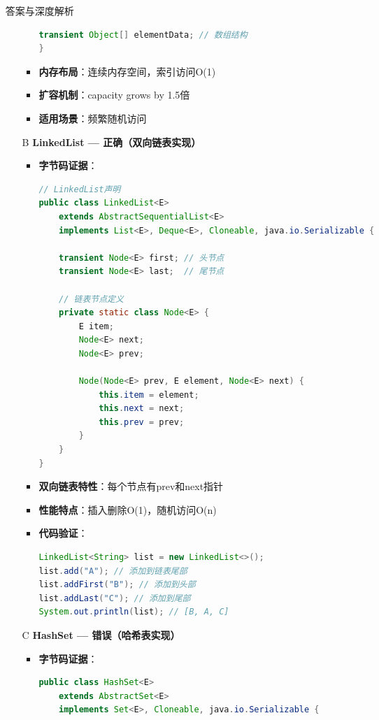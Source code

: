 \documentclass[12pt, a4paper]{ctexart}
\begin{document}
\begin{enumerate}[label=\textbf{\arabic*.}]
\begin{bluebox}{答案与深度解析}
\begin{itemize}[leftmargin=*, nosep, label={}]
\begin{itemize}[label={}, leftmargin=*, nosep]
\begin{lstlisting}[language=Java]
    transient Object[] elementData; // 数组结构
}
				      \end{lstlisting}
				            \item \textbf{内存布局}：连续内存空间，索引访问O(1)
				            \item \textbf{扩容机制}：capacity grows by 1.5倍
				            \item \textbf{适用场景}：频繁随机访问
			            \end{itemize}

			      \item[B] \textbf{LinkedList — 正确（双向链表实现）}
			            \begin{itemize}[label={}, leftmargin=*, nosep]
				            \item \textbf{字节码证据}：
				                  \begin{lstlisting}[language=Java]
// LinkedList声明
public class LinkedList<E>
    extends AbstractSequentialList<E>
    implements List<E>, Deque<E>, Cloneable, java.io.Serializable {

    transient Node<E> first; // 头节点
    transient Node<E> last;  // 尾节点

    // 链表节点定义
    private static class Node<E> {
        E item;
        Node<E> next;
        Node<E> prev;

        Node(Node<E> prev, E element, Node<E> next) {
            this.item = element;
            this.next = next;
            this.prev = prev;
        }
    }
}
				      \end{lstlisting}
				            \item \textbf{双向链表特性}：每个节点有prev和next指针
				            \item \textbf{性能特点}：插入删除O(1)，随机访问O(n)
				            \item \textbf{代码验证}：
				                  \begin{lstlisting}[language=Java]
LinkedList<String> list = new LinkedList<>();
list.add("A"); // 添加到链表尾部
list.addFirst("B"); // 添加到头部
list.addLast("C"); // 添加到尾部
System.out.println(list); // [B, A, C]
				      \end{lstlisting}
			            \end{itemize}

			      \item[C] \textbf{HashSet — 错误（哈希表实现）}
			            \begin{itemize}[label={}, leftmargin=*, nosep]
				            \item \textbf{字节码证据}：
				                  \begin{lstlisting}[language=Java]
public class HashSet<E>
    extends AbstractSet<E>
    implements Set<E>, Cloneable, java.io.Serializable {


\end{lstlisting}
\end{itemize}
\end{itemize}
\end{bluebox}
\end{enumerate}
\end{document}
